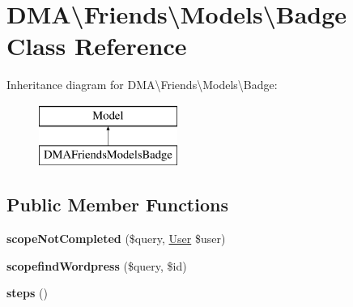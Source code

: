 \hypertarget{classDMA_1_1Friends_1_1Models_1_1Badge}{\section{D\+M\+A\textbackslash{}Friends\textbackslash{}Models\textbackslash{}Badge Class Reference}
\label{classDMA_1_1Friends_1_1Models_1_1Badge}
}
Inheritance diagram for D\+M\+A\textbackslash{}Friends\textbackslash{}Models\textbackslash{}Badge\+:\begin{figure}[H]
\begin{center}
\leavevmode
\includegraphics[height=2.000000cm]{df/d98/classDMA_1_1Friends_1_1Models_1_1Badge}
\end{center}
\end{figure}
\subsection*{Public Member Functions}
\begin{DoxyCompactItemize}
\item 
\hypertarget{classDMA_1_1Friends_1_1Models_1_1Badge_a65fc600bfefbedc8d7393ec86c848a51}{{\bfseries scope\+Not\+Completed} (\$query, \hyperlink{classDMA_1_1Friends_1_1Models_1_1User}{User} \$user)}\label{classDMA_1_1Friends_1_1Models_1_1Badge_a65fc600bfefbedc8d7393ec86c848a51}

\item 
\hypertarget{classDMA_1_1Friends_1_1Models_1_1Badge_a5ebdc91135362ca2b0225fdb0c965127}{{\bfseries scopefind\+Wordpress} (\$query, \$id)}\label{classDMA_1_1Friends_1_1Models_1_1Badge_a5ebdc91135362ca2b0225fdb0c965127}

\item 
\hypertarget{classDMA_1_1Friends_1_1Models_1_1Badge_ac40fb9fa1c7f70f29bb90e77b8f9c8aa}{{\bfseries steps} ()}\label{classDMA_1_1Friends_1_1Models_1_1Badge_ac40fb9fa1c7f70f29bb90e77b8f9c8aa}

\end{DoxyCompactItemize}
